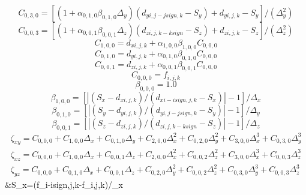 \begin{equation}
           C_{0,3,0}=[(1+\alpha_{0,1,0}\beta_{0,1,0}\Delta_y)(d_{yi,j-jsign,k}-S_y)+d_{yi,j,k}-S_y]/(\Delta_y^2)
\end{equation}
\begin{equation}
           C_{0,0,3}=[(1+\alpha_{0,0,1}\beta_{0,0,1}\Delta_z)(d_{zi,j,k-ksign}-S_z)+d_{zi,j,k}-S_z]/(\Delta_z^2)
\end{equation}
\begin{equation}
           C_{1,0,0}=d_{xi,j,k} +\alpha_{1,0,0}\beta_{1,0,0}C_{0,0,0}
\end{equation}
\begin{equation}
           C_{0,1,0}=d_{yi,j,k} +\alpha_{0,1,0}\beta_{0,1,0}C_{0,0,0}
\end{equation}
\begin{equation}
           C_{0,0,1}=d_{zi,j,k} +\alpha_{0,0,1}\beta_{0,0,1}C_{0,0,0}
\end{equation}
\begin{equation}
           C_{0,0,0}=f_{i,j,k}
\end{equation}
\begin{equation}
           \beta _{0,0,0}=1.0
\end{equation}
\begin{equation}
           \beta _{1,0,0}=[|(S_x-d_{xi,j,k})/(d_{xi-isign,j,k}-S_x)|-1]/\Delta_x
\end{equation}
\begin{equation}
           \beta _{0,1,0}=[|(S_y-d_{yi,j,k})/(d_{yi,j-jsign,k}-S_y)|-1]/\Delta_y
\end{equation}
\begin{equation}
           \beta _{0,0,1}=[|(S_z-d_{zi,j,k})/(d_{zi,j,k-ksign}-S_z)|-1]/\Delta_z
\end{equation}
\begin{eqnarray}           \zeta_{xy}=C_{0,0,0}+C_{1,0,0}\Delta_x+C_{0,1,0}\Delta_y+C_{2,0,0}\Delta_x^2+C_{0,2,0}\Delta_y^2 +C_{3,0,0}\Delta_x^3+C_{0,3,0}\Delta_y^3\\
           \zeta_{xz}=C_{0,0,0}+C_{1,0,0}\Delta_x+C_{0,0,1}\Delta_z+C_{2,0,0}\Delta_x^2+C_{0,0,2}\Delta_z^2  +C_{3,0,0}\Delta_x^3+C_{0,0,3}\Delta_z^3\\
           \zeta_{yz}=C_{0,0,0}+C_{0,1,0}\Delta_x+C_{0,0,1}\Delta_z+C_{0,2,0}\Delta_y^2+C_{0,0,2}\Delta_z^2  +C_{0,3,0}\Delta_y^3+C_{0,0,3}\Delta_z^3
\end{eqnarray}
\ba
          &S_x=(f_{i-isign,j,k}-f_{i,j,k})/\Delta_x\\
